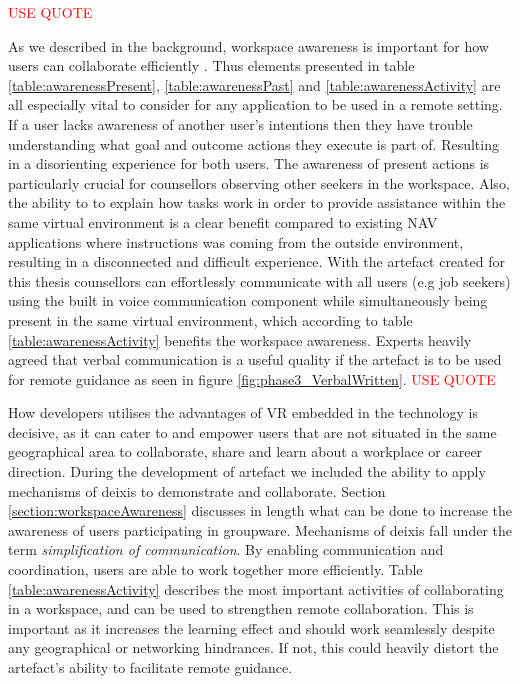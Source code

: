 \textcolor{red}{USE QUOTE}

As we described in the background, workspace awareness is important for how users can collaborate efficiently \cite{gutwin1996workspace}. Thus elements presented in table \ref{table:awarenessPresent}, \ref{table:awarenessPast}  and \ref{table:awarenessActivity} are all especially vital to consider for any application to be used in a remote setting. If a user lacks awareness of another user's intentions then they have trouble understanding what goal and outcome actions they execute is part of. Resulting in a disorienting experience for both users. The awareness of present actions is particularly crucial for counsellors observing other seekers in the workspace. Also, the ability to to explain how tasks work in order to provide assistance within the same virtual environment is a clear benefit compared to existing NAV applications where instructions was coming from the outside environment, resulting in a disconnected and difficult experience. With the artefact created for this thesis counsellors can effortlessly communicate with all users (e.g job seekers) using the built in voice communication component while simultaneously being present in the same virtual environment, which according to table \ref{table:awarenessActivity} benefits the workspace awareness. Experts heavily agreed that verbal communication is a useful quality if the artefact is to be used for remote guidance as seen in figure \ref{fig:phase3_VerbalWritten}.    \textcolor{red}{USE QUOTE}     




How developers utilises the advantages of VR embedded in the technology is decisive, as it can cater to and empower users that are not situated in the same geographical area to collaborate, share and learn about a workplace or career direction. During the development of artefact we included the ability to apply mechanisms of deixis to demonstrate and collaborate. Section \ref{section:workspaceAwareness} discusses in length what can be done to increase the awareness of users participating in groupware. Mechanisms of deixis fall under the term \textit{simplification of communication}. By enabling communication and coordination, users are able to work together more efficiently. Table \ref{table:awarenessActivity} describes the most important activities of collaborating in a workspace, and can be used to strengthen remote collaboration. This is important as it increases the learning effect \cite{stahl2006computer} and should work seamlessly despite any geographical or networking hindrances. If not, this could heavily distort the artefact's ability to facilitate remote guidance.


